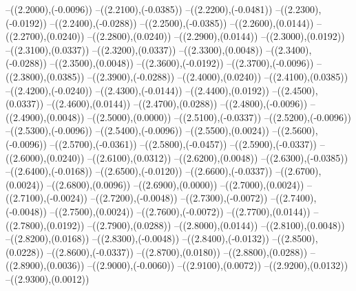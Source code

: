 {	--({\sx*(2.2000)},{\sy*(-0.0096)})
	--({\sx*(2.2100)},{\sy*(-0.0385)})
	--({\sx*(2.2200)},{\sy*(-0.0481)})
	--({\sx*(2.2300)},{\sy*(-0.0192)})
	--({\sx*(2.2400)},{\sy*(-0.0288)})
	--({\sx*(2.2500)},{\sy*(-0.0385)})
	--({\sx*(2.2600)},{\sy*(0.0144)})
	--({\sx*(2.2700)},{\sy*(0.0240)})
	--({\sx*(2.2800)},{\sy*(0.0240)})
	--({\sx*(2.2900)},{\sy*(0.0144)})
	--({\sx*(2.3000)},{\sy*(0.0192)})
	--({\sx*(2.3100)},{\sy*(0.0337)})
	--({\sx*(2.3200)},{\sy*(0.0337)})
	--({\sx*(2.3300)},{\sy*(0.0048)})
	--({\sx*(2.3400)},{\sy*(-0.0288)})
	--({\sx*(2.3500)},{\sy*(0.0048)})
	--({\sx*(2.3600)},{\sy*(-0.0192)})
	--({\sx*(2.3700)},{\sy*(-0.0096)})
	--({\sx*(2.3800)},{\sy*(0.0385)})
	--({\sx*(2.3900)},{\sy*(-0.0288)})
	--({\sx*(2.4000)},{\sy*(0.0240)})
	--({\sx*(2.4100)},{\sy*(0.0385)})
	--({\sx*(2.4200)},{\sy*(-0.0240)})
	--({\sx*(2.4300)},{\sy*(-0.0144)})
	--({\sx*(2.4400)},{\sy*(0.0192)})
	--({\sx*(2.4500)},{\sy*(0.0337)})
	--({\sx*(2.4600)},{\sy*(0.0144)})
	--({\sx*(2.4700)},{\sy*(0.0288)})
	--({\sx*(2.4800)},{\sy*(-0.0096)})
	--({\sx*(2.4900)},{\sy*(0.0048)})
	--({\sx*(2.5000)},{\sy*(0.0000)})
	--({\sx*(2.5100)},{\sy*(-0.0337)})
	--({\sx*(2.5200)},{\sy*(-0.0096)})
	--({\sx*(2.5300)},{\sy*(-0.0096)})
	--({\sx*(2.5400)},{\sy*(-0.0096)})
	--({\sx*(2.5500)},{\sy*(0.0024)})
	--({\sx*(2.5600)},{\sy*(-0.0096)})
	--({\sx*(2.5700)},{\sy*(-0.0361)})
	--({\sx*(2.5800)},{\sy*(-0.0457)})
	--({\sx*(2.5900)},{\sy*(-0.0337)})
	--({\sx*(2.6000)},{\sy*(0.0240)})
	--({\sx*(2.6100)},{\sy*(0.0312)})
	--({\sx*(2.6200)},{\sy*(0.0048)})
	--({\sx*(2.6300)},{\sy*(-0.0385)})
	--({\sx*(2.6400)},{\sy*(-0.0168)})
	--({\sx*(2.6500)},{\sy*(-0.0120)})
	--({\sx*(2.6600)},{\sy*(-0.0337)})
	--({\sx*(2.6700)},{\sy*(0.0024)})
	--({\sx*(2.6800)},{\sy*(0.0096)})
	--({\sx*(2.6900)},{\sy*(0.0000)})
	--({\sx*(2.7000)},{\sy*(0.0024)})
	--({\sx*(2.7100)},{\sy*(-0.0024)})
	--({\sx*(2.7200)},{\sy*(-0.0048)})
	--({\sx*(2.7300)},{\sy*(-0.0072)})
	--({\sx*(2.7400)},{\sy*(-0.0048)})
	--({\sx*(2.7500)},{\sy*(0.0024)})
	--({\sx*(2.7600)},{\sy*(-0.0072)})
	--({\sx*(2.7700)},{\sy*(0.0144)})
	--({\sx*(2.7800)},{\sy*(0.0192)})
	--({\sx*(2.7900)},{\sy*(0.0288)})
	--({\sx*(2.8000)},{\sy*(0.0144)})
	--({\sx*(2.8100)},{\sy*(0.0048)})
	--({\sx*(2.8200)},{\sy*(0.0168)})
	--({\sx*(2.8300)},{\sy*(-0.0048)})
	--({\sx*(2.8400)},{\sy*(-0.0132)})
	--({\sx*(2.8500)},{\sy*(0.0228)})
	--({\sx*(2.8600)},{\sy*(-0.0337)})
	--({\sx*(2.8700)},{\sy*(0.0180)})
	--({\sx*(2.8800)},{\sy*(0.0288)})
	--({\sx*(2.8900)},{\sy*(0.0036)})
	--({\sx*(2.9000)},{\sy*(-0.0060)})
	--({\sx*(2.9100)},{\sy*(0.0072)})
	--({\sx*(2.9200)},{\sy*(0.0132)})
	--({\sx*(2.9300)},{\sy*(0.0012)})
}
